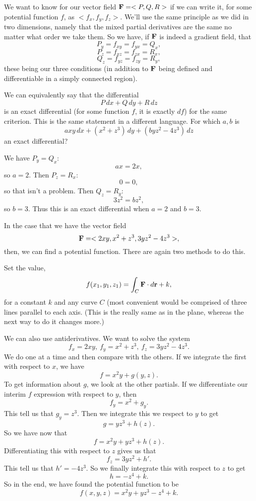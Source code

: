 We want to know for our vector field $\boldsymbol{\mathbf{F}} = <P,Q,R>$ if we can write it, for some potential function $f$, as $<f_x,f_y,f_z>$. We'll use the same principle as we did in two dimensions, namely that the mixed partial derivatives are the same no matter what order we take them. So we have, if $\boldsymbol{\mathbf{F}}$ is indeed a gradient field, that
\[ P_y = f_{xy} = f_{yx} = Q_x, \]
\[ P_z = f_{xz} = f_{zx}  = R_x, \]
\[ Q_z = f_{yz} = f_{zy} = R_y, \]
these being our three conditions (in addition to $\boldsymbol{\mathbf{F}}$ being defined and differentiable in a simply connected region).

We can equivalently say that the differential 
\[ P\,dx + Q\,dy + R\,dz \]
is an exact differential (for some function $f$, it is exactly $df$) for the same criterion. This is the same statement in a different language.
\bex
For which $a,b$ is 
\[ axy\,dx + (x^2+z^3)\,dy + (byz^2 - 4z^3)\,dz \]
an exact differential?

We have $P_y = Q_x$:
\[ ax = 2x, \]
so $a=2$. Then $P_z=R_x$:
\[ 0=0, \]
so that isn't a problem. Then $Q_z=R_y$:
\[ 3z^2=bz^2, \]
so $b=3$. Thus this is an exact differential when $a=2$ and $b=3$.

In the case that we have the vector field
\[ \boldsymbol{\mathbf{F}} = <2xy,x^2+z^3,3yz^2-4z^3>, \]
then, we can find a potential function. There are again two methods to do this.
\ben
\item Set the value, 
\[ f(x_1,y_1,z_1) = \int_C \boldsymbol{\mathbf{F}} \cdot d\boldsymbol{\mathbf{r}} + k, \]
for a constant $k$ and any curve $C$ (most convenient would be comprised of three lines parallel to each axis. (This is the really same as in the plane, whereas the next way to do it changes more.)
\item We can also use antiderivatives. We want to solve the system
\[ f_x = 2xy,\ f_y = x^2+z^3,\ f_z = 3yz^2-4z^3. \]
We do one at a time and then compare with the others. If we integrate the first with respect to $x$, we have
\[ f = x^2y + g(y,z). \]
To get information about $g$, we look at the other partials. If we differentiate our interim $f$ expression with respect to $y$, then
\[ f_y = x^2 + g_y. \]
This tell us that $g_y = z^3$. Then we integrate this we respect to $y$ to get
\[ g = yz^3 + h(z). \]
So we have now that
\[ f = x^2y + yz^3 + h(z). \]
Differentiating this with respect to $z$ gives us that
\[ f_z = 3yz^2 + h'. \]
This tell us that $h' = -4z^3$. So we finally integrate this with respect to $z$ to get
\[ h = -z^4 + k. \]
So in the end, we have found the potential function to be
\[ f(x,y,z) = x^2y + yz^3 -z^4 + k. \]
\een
\eex

